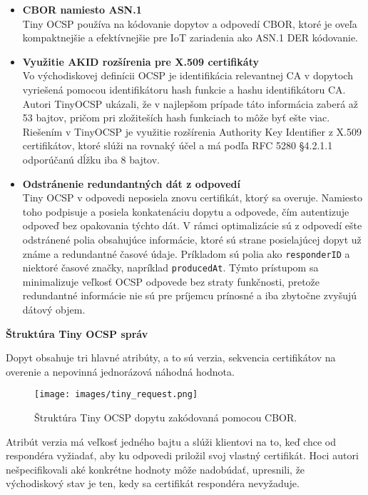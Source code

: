 \documentclass[12pt, twoside]{book}
\newcommand{\subsubsubsection}[1]{%
  \vspace{0.2em}  
  \textbf{#1} \\[0.2em]
  \hspace*{\parindent}
}
\begin{document}
\begin{itemize}
\item \textbf{CBOR namiesto ASN.1}\\
Tiny OCSP používa na kódovanie dopytov a odpovedí CBOR, ktoré je oveľa kompaktnejšie a efektívnejšie pre IoT zariadenia ako ASN.1 DER kódovanie.

\item \textbf{Využitie AKID rozšírenia pre X.509 certifikáty}\\
Vo východiskovej definícii OCSP je identifikácia relevantnej CA v dopytoch vyriešená pomocou identifikátoru hash funkcie a hashu identifikátoru CA. Autori TinyOCSP ukázali, že v najlepšom prípade táto informácia zaberá až 53 bajtov, pričom pri zložiteších hash funkciach to môže byť ešte viac. Riešením v TinyOCSP je využitie rozšírenia Authority Key Identifier z X.509 certifikátov, ktoré slúži na rovnaký účel a má podľa RFC 5280 §4.2.1.1 odporúčanú dĺžku iba 8 bajtov.\cite{tiny, rfc5280}

\item \textbf{Odstránenie redundantných dát z odpovedí}\\
Tiny OCSP v odpovedi neposiela znovu certifikát, ktorý sa overuje. Namiesto toho podpisuje a posiela konkatenáciu dopytu a odpovede, čím autentizuje odpoveď bez opakovania týchto dát. V rámci optimalizácie sú z odpovedí ešte odstránené polia  obsahujúce informácie, ktoré sú strane posielajúcej dopyt už známe a redundantné časové údaje. Príkladom sú polia ako \texttt{responderID} a niektoré časové značky, napríklad \texttt{producedAt}. Týmto prístupom sa minimalizuje veľkosť OCSP odpovede bez straty funkčnosti, pretože redundantné informácie nie sú pre príjemcu prínosné a iba zbytočne zvyšujú dátový objem.\cite{tiny}

\end{itemize}

\subsubsubsection{Štruktúra Tiny OCSP správ}
Dopyt obsahuje tri hlavné atribúty, a to sú verzia, sekvencia certifikátov na overenie a nepovinná jednorázová náhodná hodnota. 

\begin{figure}[H]
\centering
\texttt{[image: images/tiny\_request.png]}
\caption{Štruktúra Tiny OCSP dopytu zakódovaná pomocou CBOR.}
\end{figure}

Atribút verzia má veľkosť jedného bajtu a slúži klientovi na to, keď chce od respondéra vyžiadať, aby ku odpovedi priložil svoj vlastný certifikát. Hoci autori nešpecifikovali aké konkrétne hodnoty môže nadobúdať, upresnili, že východiskový stav je ten, kedy sa certifikát respondéra nevyžaduje.\cite{tiny}
\end{document}
